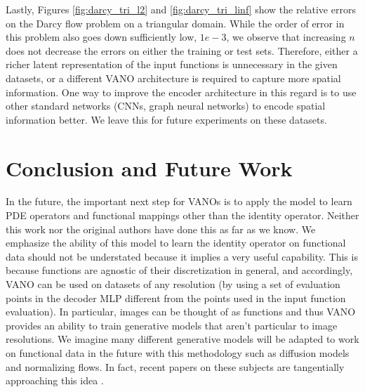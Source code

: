 \documentclass[11pt, fullpage,letterpaper]{article}
\begin{document}
\begin{enumerate}
Lastly, Figures \ref{fig:darcy_tri_l2} and \ref{fig:darcy_tri_linf} show the relative errors on the Darcy flow problem on a triangular domain. While the order of error in this problem also goes down sufficiently low, $1e-3$, we observe that increasing $n$ does not decrease the errors on either the training or test sets. Therefore, either a richer latent representation of the input functions is unnecessary in the given datasets, or a different VANO architecture is required to capture more spatial information. One way to improve the encoder architecture in this regard is to use other standard networks (CNNs, graph neural networks) to encode spatial information better. We leave this for future experiments on these datasets.

\end{enumerate}



\section{Conclusion and Future Work}

In the future, the important next step for VANOs is to apply the model to learn PDE operators and functional mappings other than the identity operator. Neither this work nor the original authors have done this as far as we know. We emphasize the ability of this model to learn the identity operator on functional data should not be understated because it implies a very useful capability. This is because functions are agnostic of their discretization in general, and accordingly, VANO can be used on datasets of any resolution (by using a set of evaluation points in the decoder MLP different from the points used in the input function evaluation). In particular, images can be thought of as functions and thus VANO provides an ability to train generative models that aren't particular to image resolutions. We imagine many different generative models will be adapted to work on functional data in the future with this methodology such as diffusion models and normalizing flows. In fact, recent papers on these subjects are tangentially approaching this idea \cite{meng2023variational}.



\end{document}
